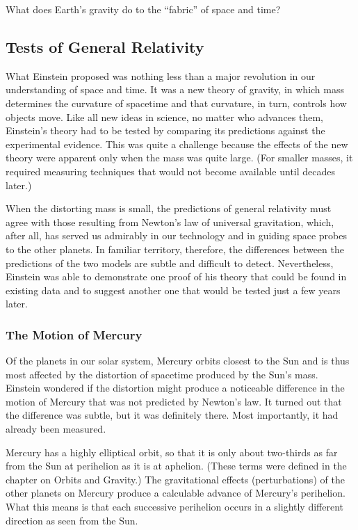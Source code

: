 \documentclass{article}
\numberwithin{equation}{section}
\numberwithin{figure}{section}
\begin{document}
\begin{exercise}\label{XFnLZe}
    What does Earth's gravity do to the ``fabric'' of space and time?
\end{exercise}

\clearpage
\subsection{Tests of General Relativity}

What Einstein proposed was nothing less than a major revolution in our understanding of space and time. It was a new theory of gravity, in which mass determines the curvature of spacetime and that curvature, in turn, controls how objects move. Like all new ideas in science, no matter who advances them, Einstein's theory had to be tested by comparing its predictions against the experimental evidence. This was quite a challenge because the effects of the new theory were apparent only when the mass was quite large. (For smaller masses, it required measuring techniques that would not become available until decades later.)
\vspace{1em}

When the distorting mass is small, the predictions of general relativity must agree with those resulting from Newton's law of universal gravitation, which, after all, has served us admirably in our technology and in guiding space probes to the other planets. In familiar territory, therefore, the differences between the predictions of the two models are subtle and difficult to detect. Nevertheless, Einstein was able to demonstrate one proof of his theory that could be found in existing data and to suggest another one that would be tested just a few years later.

\subsubsection*{The Motion of Mercury}

Of the planets in our solar system, Mercury orbits closest to the Sun and is thus most affected by the distortion of spacetime produced by the Sun's mass. Einstein wondered if the distortion might produce a noticeable difference in the motion of Mercury that was not predicted by Newton's law. It turned out that the difference was subtle, but it was definitely there. Most importantly, it had already been measured.
\vspace{1em}

Mercury has a highly elliptical orbit, so that it is only about two-thirds as far from the Sun at perihelion as it is at aphelion. (These terms were defined in the chapter on Orbits and Gravity.) The gravitational effects (perturbations) of the other planets on Mercury produce a calculable advance of Mercury's perihelion. What this means is that each successive perihelion occurs in a slightly different direction as seen from the Sun.
\vspace{1em}
\end{document}
